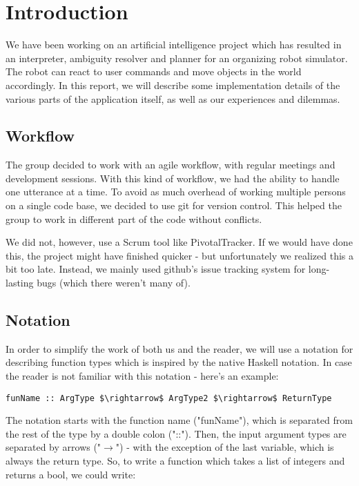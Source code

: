\section*{Introduction}
We have been working on an artificial intelligence project which has resulted in an interpreter, ambiguity resolver and planner for an organizing robot simulator.
The robot can react to user commands and move objects in the world accordingly.
In this report, we will describe some implementation details of the various parts of the application itself, as well as our experiences and dilemmas.

\subsection*{Workflow}
The group decided to work with an agile workflow, with regular meetings and development sessions.
With this kind of workflow, we had the ability to handle one utterance at a time.
To avoid as much overhead of working multiple persons on a single code base, we decided to use git for version control.
This helped the group to work in different part of the code without conflicts.

We did not, however, use a Scrum tool like PivotalTracker. If we would have done this, the project might have finished quicker - but unfortunately we realized this a bit too late.
Instead, we mainly used github's issue tracking system for long-lasting bugs (which there weren't many of).

\subsection*{Notation}
In order to simplify the work of both us and the reader, we will use a notation for describing function types which is inspired by the native Haskell notation.
In case the reader is not familiar with this notation - here's an example:

\begin{lstlisting}
funName :: ArgType $\rightarrow$ ArgType2 $\rightarrow$ ReturnType
\end{lstlisting}

The notation starts with the function name ("funName"), which is separated from the rest of the type by a double colon ("::").
Then, the input argument types are separated by arrows ("$\rightarrow$") - with the exception of the last variable, which is always the return type.
So, to write a function which takes a list of integers and returns a bool, we could write:

